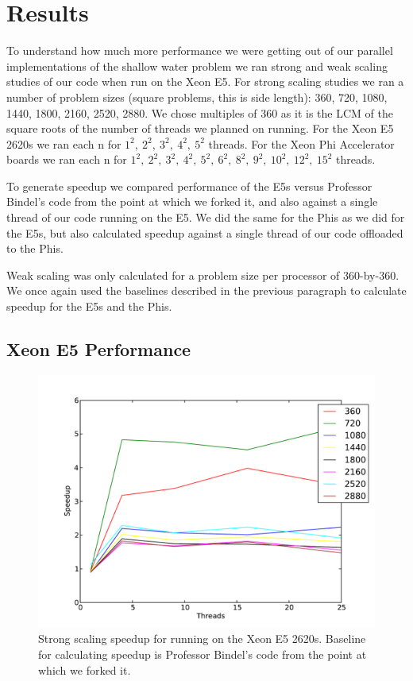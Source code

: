 \section{Results}

To understand how much more performance we were getting out of our parallel implementations of the shallow water problem we ran strong and weak scaling studies of our code when run on the Xeon E5. For strong scaling studies we ran a number of problem sizes (square problems, this is side length): 360, 720, 1080, 1440, 1800, 2160, 2520, 2880. We chose multiples of 360 as it is the LCM of the square roots of the number of threads we planned on running. For the Xeon E5 2620s we ran each n for $1^2,~2^2,~3^2,~4^2,~5^2$ threads. For the Xeon Phi Accelerator boards we ran each n for $1^2,~2^2,~3^2,~4^2,~5^2,~6^2,~8^2,~9^2,~10^2,~12^2,~15^2$ threads.

To generate speedup we compared performance of the E5s versus Professor Bindel's code from the point at which we forked it, and also against a single thread of our code running on the E5. We did the same for the Phis as we did for the E5s, but also calculated speedup against a single thread of our code offloaded to the Phis.

Weak scaling was only calculated for a problem size per processor of 360-by-360. We once again used the baselines described in the previous paragraph to calculate speedup for the E5s and the Phis.

\subsection{Xeon E5 Performance}

\begin{figure}[h!]
\includegraphics[width=0.5\linewidth]{e5_strong_bindel_baseline.pdf}
\caption{Strong scaling speedup for running on the Xeon E5 2620s. Baseline for calculating speedup is Professor Bindel's code from the point at which we forked it.}
\end{figure}

